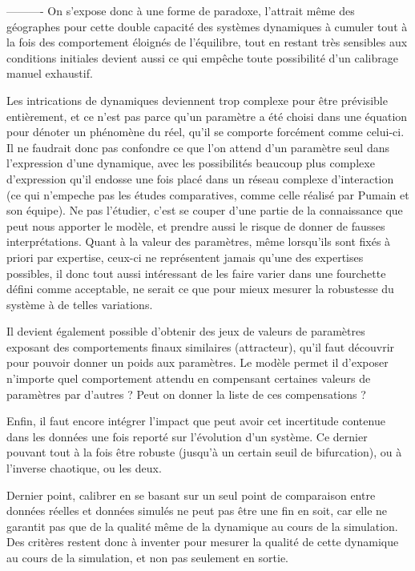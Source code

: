 ----------
On s'expose donc à une forme de paradoxe, l'attrait même des géographes pour cette double capacité des systèmes dynamiques à cumuler tout à la fois des comportement éloignés de l'équilibre, tout en restant très sensibles aux conditions initiales devient aussi ce qui empêche toute possibilité d'un calibrage manuel exhaustif.

Les intrications de dynamiques deviennent trop complexe pour être prévisible entièrement, et ce n'est pas parce qu'un paramètre a été choisi dans une équation pour dénoter un phénomène du réel, qu'il se comporte forcément comme celui-ci. Il ne faudrait donc pas confondre ce que l'on attend d'un paramètre seul dans l'expression d'une dynamique, avec les possibilités beaucoup plus complexe d'expression qu'il endosse une fois placé dans un réseau complexe d'interaction (ce qui n'empeche pas les études comparatives, comme celle réalisé par Pumain et son équipe). Ne pas l'étudier, c'est se couper d'une partie de la connaissance que peut nous apporter le modèle, et prendre aussi le risque de donner de fausses interprétations. Quant à la valeur des paramètres, même lorsqu'ils sont fixés à priori par expertise, ceux-ci ne représentent jamais qu'une des expertises possibles, il donc tout aussi intéressant de les faire varier dans une fourchette défini comme acceptable, ne serait ce que pour mieux mesurer la robustesse du système à de telles variations.

Il devient également possible d'obtenir des jeux de valeurs de paramètres exposant des comportements finaux similaires (attracteur), qu'il faut découvrir pour pouvoir donner un poids aux paramètres. Le modèle permet il d'exposer n'importe quel comportement attendu en compensant certaines valeurs de paramètres par d'autres ? Peut on donner la liste de ces compensations ?

Enfin, il faut encore intégrer l'impact que peut avoir cet incertitude contenue dans les données une fois reporté sur l'évolution d'un système. Ce dernier pouvant tout à la fois être robuste (jusqu'à un certain seuil de bifurcation), ou à l'inverse chaotique, ou les deux.

Dernier point, calibrer en se basant sur un seul point de comparaison entre données réelles et données simulés ne peut pas être une fin en soit, car elle ne garantit pas que de la qualité même de la dynamique au cours de la simulation. Des critères restent donc à inventer pour mesurer la qualité de cette dynamique au cours de la simulation, et non pas seulement en sortie.

